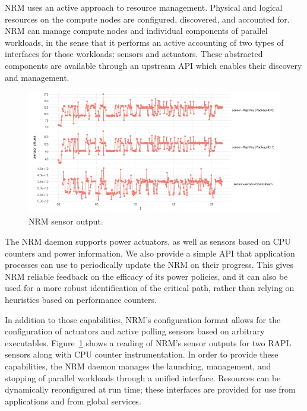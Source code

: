 NRM uses an active approach to resource management. Physical and logical
resources on the compute nodes are configured, discovered, and accounted for.
NRM can manage compute nodes and individual components of parallel workloads,
in the sense that it performs an active accounting of two types of interfaces
for those workloads: sensors and actuators. These abstracted components are
available through an upstream API which enables their discovery and management.

\begin{figure}
  \includegraphics[width=.58\textwidth]{projects/2.3.1-PMR/2.3.1.19-Argo-PowerSteering/sensors}
  \caption{NRM sensor output.}
  \label{fig:argo-sensors}
\end{figure}

The NRM daemon supports power actuators, as well as sensors based on CPU counters
and power information. We also provide a simple API that application processes
can use to periodically update the NRM on their progress. This gives NRM
reliable feedback on the efficacy of its power policies, and it can also
be used for a more robust identification of the critical path, rather than
relying on heuristics based on performance counters.

In addition to those capabilities, NRM's configuration format allows for
the configuration of actuators and active polling sensors based on arbitrary
executables. Figure~\ref{fig:argo-sensors} shows a reading of NRM's sensor
outputs for two RAPL sensors along with CPU counter instrumentation. In order
to provide these capabilities, the NRM daemon manages the launching, management,
and stopping of parallel workloads through a unified interface. Resources
can be dynamically reconfigured at run time; these interfaces are provided
for use from applications and from global services.

